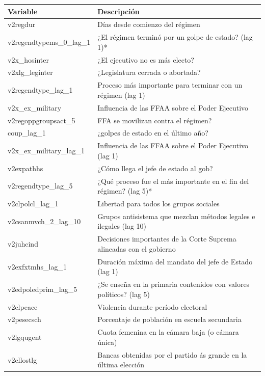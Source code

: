 \documentclass{article}
\begin{document}
\begin{table}[H]
  \begin{tabular}{ll}
    \toprule
    Variable                  & Descripción \\
    \midrule
    v2regdur                   & Días desde comienzo del régimen \\
    v2regendtypems\_0\_lag\_1  & ¿El régimen terminó por un golpe de estado? (lag 1)* \\
    v2x\_hosinter              & ¿El ejecutivo no es más electo? \\
    v2xlg\_leginter            & ¿Legislatura cerrada o abortada? \\
    v2regendtype\_lag\_1       & Proceso más importante para terminar con un régimen (lag 1) \\
    v2x\_ex\_military          & Influencia de las FFAA sobre el Poder Ejecutivo \\
    v2regoppgroupsact\_5       & FFA se movilizan contra el régimen? \\
    coup\_lag\_1               & ¿golpes de estado en el último año? \\
    v2x\_ex\_military\_lag\_1  & Influencia de las FFAA sobre el Poder Ejecutivo (lag 1) \\
    v2expathhs                 & ¿Cómo llega el jefe de estado al gob? \\
    v2regendtype\_lag\_5       & ¿Qué proceso fue el más importante en el fin del régimen? (lag 5)* \\
    v2clpolcl\_lag\_1          & Libertad para todos los grupos sociales \\
    v2csanmvch\_2\_lag\_10     & Grupos antisistema que mezclan métodos legales e ilegales (lag 10) \\
    v2juhcind                  & Decisiones importantes de la Corte Suprema alineadas con el gobierno \\
    v2exfxtmhs\_lag\_1         & Duración máxima del mandato del jefe de Estado (lag 1) \\
    v2edpoledprim\_lag\_5      & ¿Se enseña en la primaria contenidos con valores políticos? (lag 5) \\
    v2elpeace                  & Violencia durante período electoral \\
    v2pesecsch                 & Porcentaje de población en escuela secundaria \\
    v2lgqugent                 & Cuota femenina en la cámara baja (o cámara única) \\
    v2ellostlg                 & Bancas obtenidas por el partido ás grande en la última elección \\

\end{tabular}
\end{table}
\end{document}
